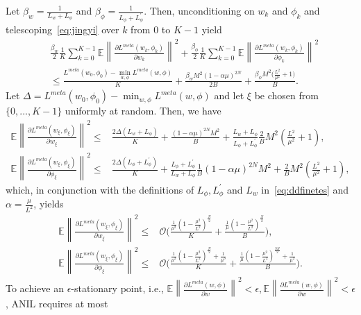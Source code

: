 \documentclass{osudissert96}
\begin{document}
Let $\beta_w=\frac{1}{L_w+L_\phi}$ and $\beta_\phi = \frac{1}{L_\phi+L_\phi^\prime}$. Then, 
unconditioning on $w_k$ and $\phi_k$ and telescoping~\cref{eq:jingyi} over $k$ from $0$ to $K-1$ yield 
\begin{align}
&\frac{\beta_w}{2}\frac{1}{K}\sum_{k=0}^{K-1}\mathbb{E}\left\| \frac{\partial L^{meta}(w_k,\phi_k)}{\partial w_k}\right\|^2 + \frac{\beta_\phi}{2}\frac{1}{K}\sum_{k=0}^{K-1}\mathbb{E}\left\| \frac{\partial L^{meta}(w_{k},\phi_k)}{\partial \phi_k}  \right\|^2 \nonumber
\\& \leq  \frac{L^{meta}(w_0,\phi_0)-\min_{w,\phi}L^{meta}(w,\phi) }{K}+ \frac{\beta_w M^2(1-\alpha\mu)^{2N}}{2B}+\frac{  \beta_\phi M^2\big( \frac{L^2}{\mu^2}+1 \big)}{B}.
\end{align}
Let $\Delta = L^{meta}(w_0,\phi_0)-\min_{w,\phi}L^{meta}(w,\phi)$ and let $\xi$ be chosen from $\{0,...,K-1\}$ uniformly at random. Then, we have 
\begin{align*}
\mathbb{E}\left\| \frac{\partial L^{meta}(w_\xi,\phi_\xi)}{\partial w_\xi}\right\|^2  \leq& \frac{2\Delta (L_w+L_\phi)}{K} + \frac{(1-\alpha\mu)^{2N} M^2}{B}+\frac{L_w+L_\phi}{L_\phi+L_\phi^\prime}\frac{2 }{B} M^2 \left( \frac{L^2}{\mu^2}+1 \right), \nonumber
\\\mathbb{E}\left\| \frac{\partial L^{meta}(w_\xi,\phi_\xi)}{\partial \phi_\xi}\right\|^2  \leq &\frac{2\Delta (L_\phi+L_\phi^\prime)}{K} +\frac{L_\phi+L_\phi^\prime}{L_w+L_\phi}\frac{1}{B}(1-\alpha\mu)^{2N} M^2+\frac{ 2}{B} M^2 \left( \frac{L^2}{\mu^2}+1 \right),
\end{align*}
which, in conjunction with the definitions of $L_\phi,L_\phi^\prime$ and $L_w$ in~\cref{eq:ddfinetes} and $\alpha=\frac{\mu}{L^2}$, yields 
\begin{align*}
\mathbb{E}\left\| \frac{\partial L^{meta}(w_\xi,\phi_\xi)}{\partial w_\xi}\right\|^2  \leq& \mathcal{O}\Bigg( \frac{  \frac{1}{\mu^2}\left(1-\frac{\mu^2}{L^2}\right)^{\frac{N}{2}}}{K}      +\frac{\frac{1}{\mu} \left(1-\frac{\mu^2}{L^2}\right)^{\frac{N}{2}}}{B}     \Bigg), \nonumber
\\\mathbb{E}\left\| \frac{\partial L^{meta}(w_\xi,\phi_\xi)}{\partial \phi_\xi}\right\|^2  \leq & \mathcal{O}\Bigg(\frac{ \frac{1}{\mu^2}\left(1-\frac{\mu^2}{L^2}\right)^{\frac{N}{2}}+\frac{1}{\mu^3}}{K} +\frac{\frac{1}{\mu}\left(1-\frac{\mu^2}{L^2}\right)^{\frac{3N}{2}}+\frac{1}{\mu^2}}{B}\Bigg).
\end{align*}
To achieve an $\epsilon$-stationary point, i.e., {\small $\mathbb{E}\left\| \frac{\partial L^{meta}(w,\phi)}{\partial w}\right\|^2 <\epsilon,\mathbb{E}\left\| \frac{\partial L^{meta}(w,\phi)}{\partial w}\right\|^2 <\epsilon$}, ANIL requires at most 
\end{document}
